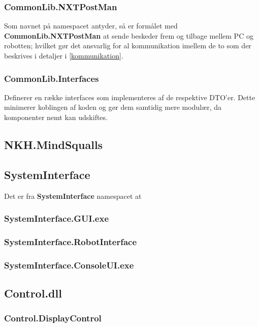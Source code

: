 \subsubsection{CommonLib.NXTPostMan}
Som navnet på namespacet antyder, så er formålet med \textbf{CommonLib.NXTPostMan} at sende beskeder frem og tilbage mellem PC og robotten; hvilket gør det ansvarlig for al kommunikation imellem de to som der beskrives i detaljer i \cref{kommunikation}.

\subsubsection{CommonLib.Interfaces}
Definerer en række interfaces som implementeres af de respektive DTO'er.
Dette minimerer koblingen af koden og gør dem samtidig mere modulær, da komponenter nemt kan udskiftes.

\subsection{NKH.MindSqualls}\label{arkitektur:mindsqualls}


\subsection{SystemInterface}\label{arkitektur:systeminterface}
Det er fra \textbf{SystemInterface} namespacet at 

\subsubsection{SystemInterface.GUI.exe}

\subsubsection{SystemInterface.RobotInterface}

\subsubsection{SystemInterface.ConsoleUI.exe}

\subsection{Control.dll}\label{arkitektur:control}


\subsubsection{Control.DisplayControl}

